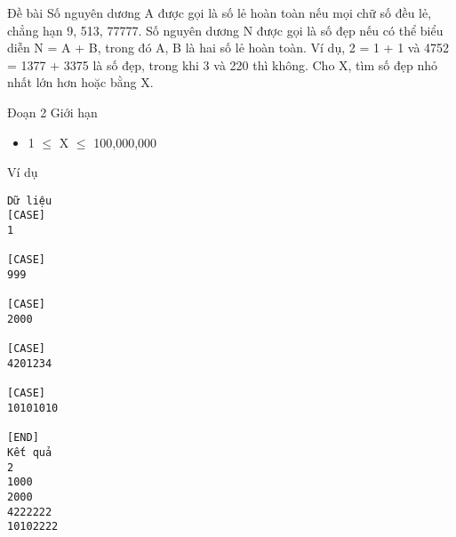 Đề bài
Số nguyên dương A được gọi là số lẻ hoàn toàn nếu mọi chữ số đều lẻ, chẳng hạn 9, 513, 77777. Số nguyên dương N được gọi là số đẹp nếu có thể biểu diễn N = A + B, trong đó A, B là hai số lẻ hoàn toàn. Ví dụ, 2 = 1 + 1 và 4752 = 1377 + 3375 là số đẹp, trong khi 3 và 220 thì không. Cho X, tìm số đẹp nhỏ nhất lớn hơn hoặc bằng X.  

   Đoạn 2
Giới hạn
\begin{itemize}
	\item     1  $\le$  X  $\le$  100,000,000   
\end{itemize}
Ví dụ
\begin{verbatim}
Dữ liệu
[CASE]
1

[CASE]
999

[CASE]
2000

[CASE]
4201234

[CASE]
10101010

[END]
Kết quả
2
1000
2000
4222222
10102222
\end{verbatim}